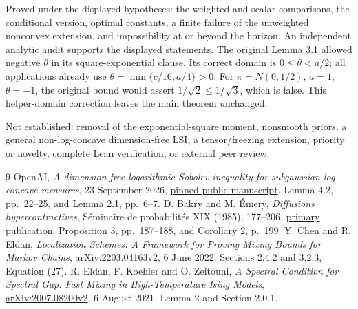 \documentclass[11pt]{article}
\theoremstyle{remark}\newtheorem{remark}[theorem]{Remark}
\begin{document}
Proved under the displayed hypotheses: the weighted and scalar comparisons,
the conditional version, optimal constants, a finite failure of the
unweighted nonconvex extension, and impossibility at or beyond the horizon.
An independent analytic audit supports the displayed statements. The original
Lemma 3.1 allowed negative $\theta$ in its square-exponential clause. Its
correct domain is $0\le\theta<a/2$; all applications already use
$\theta=\min\{c/16,a/4\}>0$. For $\pi=N(0,1/2)$, $a=1$, $\theta=-1$,
the original bound would assert $1/\sqrt2\le1/\sqrt3$, which is false.
This helper-domain correction leaves the main theorem unchanged.

Not established: removal of the exponential-square moment, nonsmooth priors,
a general non-log-concave dimension-free LSI, a tensor/freezing extension,
priority or novelty, complete Lean verification, or external peer review.

\begin{thebibliography}{9}
 OpenAI, \emph{A dimension-free logarithmic Sobolev inequality for
subgaussian log-concave measures}, 23 September 2026,
\href{https://github.com/openai/math/blob/adc7f1241b42e322a6451854ab7e4b4c146bf78a/preprints/A-dimension-free-logarithmic-Sobolev-inequality-for-subgaussian-log-concave-measures-September-23-2026/paper.pdf}{pinned public manuscript}.
Lemma 4.2, pp.\ 22--25, and Lemma 2.1, pp.\ 6--7.
 D. Bakry and M. \'Emery, \emph{Diffusions hypercontractives},
S\'eminaire de probabilit\'es XIX (1985), 177--206,
\href{https://www.numdam.org/item/SPS_1985__19__177_0/}{primary publication}.
Proposition 3, pp.\ 187--188, and Corollary 2, p.\ 199.
 Y. Chen and R. Eldan, \emph{Localization Schemes: A Framework for
Proving Mixing Bounds for Markov Chains},
\href{https://arxiv.org/abs/2203.04163v2}{arXiv:2203.04163v2}, 6 June 2022.
Sections 2.4.2 and 3.2.3, Equation (27).
 R. Eldan, F. Koehler and O. Zeitouni, \emph{A Spectral Condition
for Spectral Gap: Fast Mixing in High-Temperature Ising Models},
\href{https://arxiv.org/abs/2007.08200v2}{arXiv:2007.08200v2}, 6 August 2021.
Lemma 2 and Section 2.0.1.
\end{thebibliography}
\end{document}
